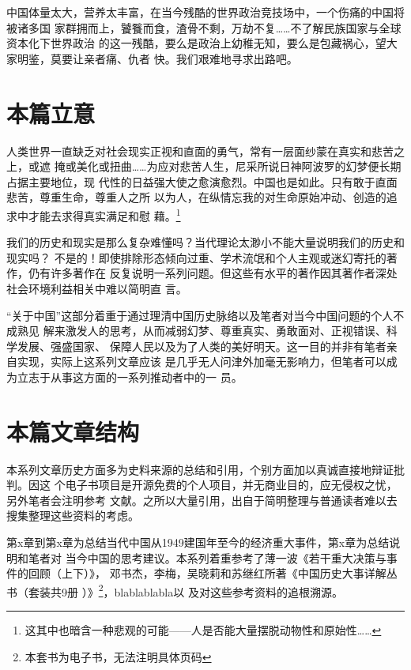 中国体量太大，营养太丰富，在当今残酷的世界政治竞技场中，一个伤痛的中国将被诸多国
家群拥而上，饕餮而食，渣骨不剩，万劫不复……不了解民族国家与全球资本化下世界政治
的这一残酷，要么是政治上幼稚无知，要么是包藏祸心，望大家明鉴，莫要让亲者痛、仇者
快。我们艰难地寻求出路吧。

\section{本篇立意}


人类世界一直缺乏对社会现实正视和直面的勇气，常有一层面纱蒙在真实和悲苦之上，或遮
掩或美化或扭曲……为应对悲苦人生，尼采所说日神阿波罗的幻梦便长期占据主要地位，现
代性的日益强大使之愈演愈烈。中国也是如此。只有敢于直面悲苦，尊重生命，尊重人之所
以为人，在纵情忘我的对生命原始冲动、创造的追求中才能去求得真实满足和慰
藉。\footnote{这其中也暗含一种悲观的可能——人是否能大量摆脱动物性和原始性……}

我们的历史和现实是那么复杂难懂吗？当代理论太渺小不能大量说明我们的历史和现实吗？
不是的！即使排除形态倾向过重、学术流氓和个人主观或迷幻寄托的著作，仍有许多著作在
反复说明一系列问题。但这些有水平的著作因其著作者深处社会环境利益相关中难以简明直
言。

“关于中国”这部分着重于通过理清中国历史脉络以及笔者对当今中国问题的个人不成熟见
解来激发人的思考，从而减弱幻梦、尊重真实、勇敢面对、正视错误、科学发展、强盛国家、
保障人民以及为了人类的美好明天。这一目的并非有笔者亲自实现，实际上这系列文章应该
是几乎无人问津外加毫无影响力，但笔者可以成为立志于从事这方面的一系列推动者中的一
员。

\section{本篇文章结构}

本系列文章历史方面多为史料来源的总结和引用，个别方面加以真诚直接地辩证批判。因这
个电子书项目是开源免费的个人项目，并无商业目的，应无侵权之忧，另外笔者会注明参考
文献。之所以大量引用，出自于简明整理与普通读者难以去搜集整理这些资料的考虑。

第x章到第x章为总结当代中国从1949建国年至今的经济重大事件，第x章为总结说明和笔者对
当今中国的思考建议。本系列着重参考了薄一波《若干重大决策与事件的回顾（上下）》，
邓书杰，李梅，吴晓莉和苏继红所著《中国历史大事详解丛书（套装共9册
）》\cite{zhengshujie}\footnote{本套书为电子书，无法注明具体页码}，blablablabla以
及对这些参考资料的追根溯源。 


